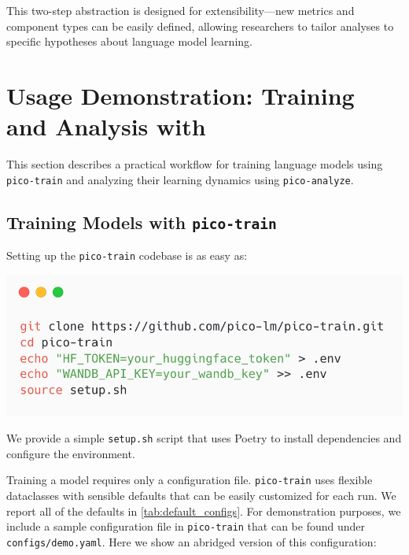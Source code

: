 This two-step abstraction is designed for extensibility—new metrics and component types can be easily defined, allowing researchers to tailor analyses to specific hypotheses about language model learning. 


\section{Usage Demonstration: Training and Analysis with \picolarge}

This section describes a practical workflow for training language models using \texttt{pico-train} and analyzing their learning dynamics using \texttt{pico-analyze}.

\subsection{Training Models with \texttt{pico-train}}

Setting up the \texttt{pico-train} codebase is as easy as:

\begin{center}
    \includegraphics[width=0.7\columnwidth]{chapters/pico/figures/demo/demo_setup.png}
\end{center}

We provide a simple \verb|setup.sh| script that uses Poetry \citep{poetry} to install dependencies and configure the environment.

Training a model requires only a configuration file. \texttt{pico-train} uses flexible dataclasses with sensible defaults that can be easily customized for each run. We report all of the defaults in \cref{tab:default_configs}. For demonstration purposes, we include a sample configuration file in \texttt{pico-train} that can be found under \verb|configs/demo.yaml|. Here we show an abridged version of this configuration:

